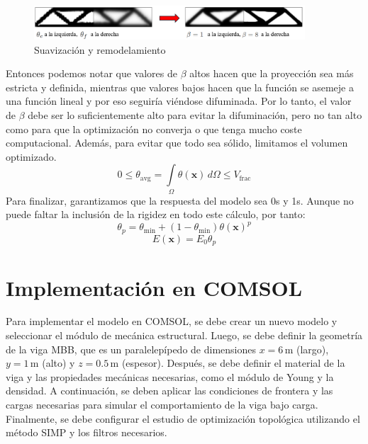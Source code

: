 \documentclass{article}
\theoremstyle{mytheoremstyle}
\theoremstyle{mytheoremstyle}
\theoremstyle{myproblemstyle}
\begin{document}
            \begin{figure}[H]
              \centering
              \includegraphics[width=0.9\textwidth]{1.png}
              \caption{Suavización y remodelamiento}
              \label{fig:imagen_x}
            \end{figure}
          Entonces podemos notar que valores de $\beta$ altos hacen que la proyección sea más estricta y definida, mientras que valores bajos hacen que la función se asemeje a una función lineal y por eso seguiría viéndose difuminada. Por lo tanto, el valor de $\beta$ debe ser lo suficientemente alto para evitar la difuminación, pero no tan alto como para que la optimización no converja o que tenga mucho coste computacional.
          Además, para evitar que todo sea sólido, limitamos el volumen optimizado.
          \begin{equation}
            0 \leq \theta_{\mathrm{avg}} = \int\limits_{\Omega} \theta(\mathbf{x})\, d\Omega \leq V_{\mathrm{frac}}
          \end{equation}
            Para finalizar, garantizamos que la respuesta del modelo sea 0s y 1s. Aunque no puede faltar la inclusión de la rigidez en todo este cálculo, por tanto:
          \begin{equation}
            \theta_p = \theta_{\min} + (1 - \theta_{\min}) \theta(\mathbf{x})^p
          \end{equation}
          \begin{equation}
            E(\mathbf{x}) = E_0 \theta_p
          \end{equation}
          \section{Implementación en COMSOL}
          Para implementar el modelo en COMSOL, se debe crear un nuevo modelo y seleccionar el módulo de mecánica estructural. Luego, se debe definir la geometría de la viga MBB, que es un paralelepípedo de dimensiones $x = 6\,\mathrm{m}$ (largo), $y = 1\,\mathrm{m}$ (alto) y $z = 0.5\,\mathrm{m}$ (espesor). Después, se debe definir el material de la viga y las propiedades mecánicas necesarias, como el módulo de Young y la densidad. A continuación, se deben aplicar las condiciones de frontera y las cargas necesarias para simular el comportamiento de la viga bajo carga. Finalmente, se debe configurar el estudio de optimización topológica utilizando el método SIMP y los filtros necesarios.
\end{document}
